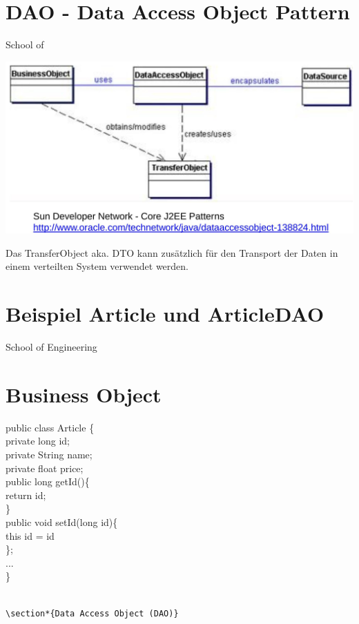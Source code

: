 \section*{DAO - Data Access Object Pattern}

School of

\includegraphics[width=\linewidth]{images/2025_01_02_5ba1dc702e9f94ba8e06g-24.jpg}

Das TransferObject aka. DTO kann zusätzlich für den Transport der Daten in einem verteilten System verwendet werden.

\section*{Beispiel Article und ArticleDAO}

School of Engineering

\section*{Business Object}


public class Article \{\\
private long id;\\
private String name;\\
private float price;\\
public long getId()\{\\
return id;\\
\}\\
public void setId(long id)\{\\
this id = id\\
\};\\
...\\
\}

\begin{verbatim}

\section*{Data Access Object (DAO)}
\end{verbatim}

